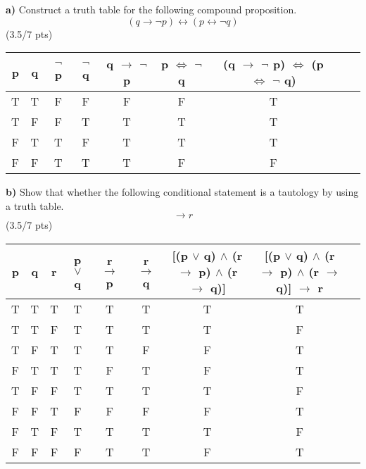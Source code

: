 \documentclass[a4paper,12pt]{article}
\newcommand\tab[1][1cm]{\hspace*{#1}}
\begin{document}
\tab \textbf{a)} Construct a truth table for the following compound proposition.
\begin{equation*}
    (q \rightarrow \neg p)\leftrightarrow (p \leftrightarrow \neg q)
\end{equation*} 
\hfill \small{(3.5/7 pts)} \\
\begin{tcolorbox}
\begin{tabular} { 
  |c|c|c|c|c|c|c|c|c|  }
 \hline
 p & q & $\lnot$ p &  $\lnot$ q  & q $\rightarrow$ $\lnot$ p & p $\Leftrightarrow$ $\lnot$ q & (q $\rightarrow$ $\lnot$ p) $\Leftrightarrow$ (p $\Leftrightarrow$ $\lnot$ q) \\
  
 \hline
 T & T  & F & F & F & F & T    \\
 \hline
 T & F  & F & T & T & T & T  \\
 \hline
 F & T  & T & F & T & T & T  \\
 \hline
 F & F  & T & T & T & F & F  \\
 
\hline
\end{tabular}

\end{tcolorbox}
\newpage
\tab \textbf{b)} Show that whether the following conditional statement is a tautology by using a truth table.
\begin{equation*}
    [(p \vee q) \wedge (r \rightarrow p) \wedge (r \rightarrow q)] \rightarrow r
\end{equation*}
\hfill \small{(3.5/7 pts)}\\
\begin{tcolorbox}
\begin{tabular} { 
  |c|c|c|c|c|c|c|c|c|  }
 \hline
 p & q & r & p $\lor$ q & r $\rightarrow$ p & r $\rightarrow$ q & [(p $\lor$ q) $\land$ (r$\rightarrow$ p) $\land$ (r $\rightarrow$ q)] & [(p $\lor$ q) $\land$ (r $\rightarrow$ p) $\land$ (r $\rightarrow$ q)] $\rightarrow$ r   \\
  
 \hline
 T & T  & T & T & T & T & T & T    \\
 \hline
 T & T  & F & T & T & T & T & F  \\
 \hline
 T & F  & T & T & T & F & F & T  \\
 \hline
 F & T  & T & T & F & T & F & T  \\
 \hline
 T & F  & F & T & T & T & T & F    \\
 \hline
 F & F & T & F & F & F & F & T    \\
 \hline
 F & T  & F & T & T & T & T & F    \\
 \hline
 F & F  & F & F & T & T & F & T    \\
 
\hline
\end{tabular}

\end{tcolorbox}
\end{document}
